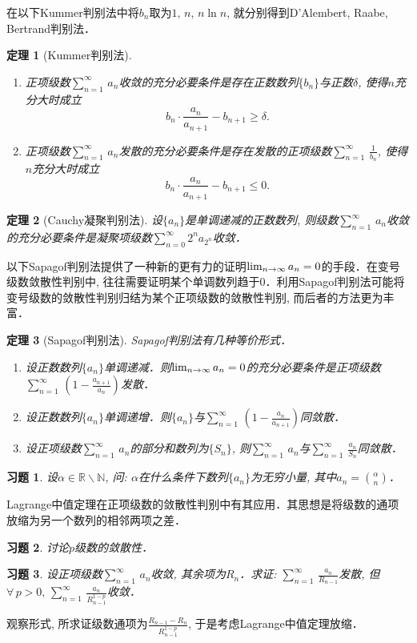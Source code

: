\documentclass[11pt,a4paper]{ctexart}
\makeatletter
\theoremstyle{thmseries} %
\newtheorem{thm}{定理}[section]
\theoremstyle{exerseries}
\newtheorem{exer}{习题}[section]
\renewenvironment{proof}[1][\proofname]{\par
  \pushQED{\qed}%
  \normalfont \topsep6\p@\@plus6\p@\relax
  \trivlist
  \item[\hskip\labelsep
        \itshape
    #1\@addpunct{}]\ignorespaces
}{%
  \popQED\endtrivlist\@endpefalse
}
\newenvironment{pf}{\begin{proof}[\bfseries\upshape 证\quad]}{\end{proof}}
\newcommand{\bra}[1]{\mathopen{}\left(#1\right)}
\newcommand{\R}{\mathbb{R}}
\newcommand{\N}{\mathbb{N}}
\def \nti {\mathnormal{n}\to\infty}
\def \tseries {{\textstyle\sum\limits_{n=1}^{\infty}}\,} %
\def \vs {\vspace{-1em}}
\makeatother
\begin{document}
在以下Kummer判别法中将$b_n$取为$1,\,n,\,n\ln n$, 就分别得到D'Alembert, Raabe, Bertrand判别法．
\begin{thm}[Kummer判别法]
	\phantom{text}
	\begin{enumerate}
		\item 正项级数$\tseries a_n$收敛的充分必要条件是存在正数数列$\{b_n\}$与正数$\delta$, 使得$n$充分大时成立\vs
		\[b_n\cdot\frac{a_n}{a_{n+1}}-b_{n+1}\geq\delta.\]
		\item 正项级数$\tseries a_n$发散的充分必要条件是存在发散的正项级数$\tseries\frac{1}{b_n}$, 使得$n$充分大时成立\vs
		\[b_n\cdot\frac{a_n}{a_{n+1}}-b_{n+1}\leq0.\]
	\end{enumerate}\vspace{-1.5em}
\end{thm}

\begin{thm}[Cauchy凝聚判别法]
	设$\{a_n\}$是单调递减的正数数列, 则级数$\tseries a_n$收敛的充分必要条件是凝聚项级数$\textstyle\sum\limits_{n=0}^{\infty}2^na_{2^n}$收敛．
\end{thm}

以下Sapagof判别法提供了一种新的更有力的证明$\lim_{\nti}a_n=0$的手段．在变号级数敛散性判别中, 往往需要证明某个单调数列趋于$0$．利用Sapagof判别法可能将变号级数的敛散性判别归结为某个正项级数的敛散性判别, 而后者的方法更为丰富．
\begin{thm}[Sapagof判别法]
	Sapagof判别法有几种等价形式．
	\begin{enumerate}
		\item 设正数数列$\{a_n\}$单调递减．则$\lim_{\nti}a_n=0$的充分必要条件是正项级数$\tseries\bra{1-\frac{a_{n+1}}{a_n}}$发散．
		\item 设正数数列$\{a_n\}$单调递增．则$\{a_n\}$与$\tseries\bra{1-\frac{a_n}{a_{n+1}}}$同敛散．
		\item 设正项级数$\tseries a_n$的部分和数列为$\{S_n\}$, 则$\tseries a_n$与$\tseries\frac{a_n}{S_n}$同敛散．
	\end{enumerate}
\end{thm}

\begin{exer}
	设$\alpha\in\R\backslash\N$, 问: $\alpha$在什么条件下数列$\{a_n\}$为无穷小量, 其中$a_n=\binom{\alpha}{n}$．
\end{exer}

Lagrange中值定理在正项级数的敛散性判别中有其应用．其思想是将级数的通项放缩为另一个数列的相邻两项之差．
\begin{exer}
	讨论$p$级数的敛散性．
\end{exer}
\begin{exer}
	设正项级数$\tseries a_n$收敛, 其余项为$R_n$．求证: $\tseries\frac{a_n}{R_{n-1}}$发散, 但$\forall\,p>0,\,\tseries\frac{a_n}{R_{n-1}^{1-p}}$收敛．
\end{exer}
\begin{pf}
	观察形式, 所求证级数通项为$\frac{R_{n-1}-R_n}{R_{n-1}^{1-p}}$, 于是考虑Lagrange中值定理放缩．
\end{pf}
\end{document}
